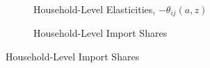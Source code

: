 \documentclass[12pt,pdftex]{article}
\begin{document}
\begin{onehalfspacing}
\begin{figure}[t!]
\centering
\begin{subfigure}{.45\textwidth}
\centering
{}
\caption{Household-Level Elasticities, $-\theta_{ij}(a,z)$}\label{fig:micro-elasticity}
\end{subfigure}
\begin{subfigure}{.45\textwidth}
\centering
{}
\caption{Household-Level Import Shares}\label{fig:micro-trade}
\end{subfigure}
\end{figure}


\end{onehalfspacing}
\end{document}
